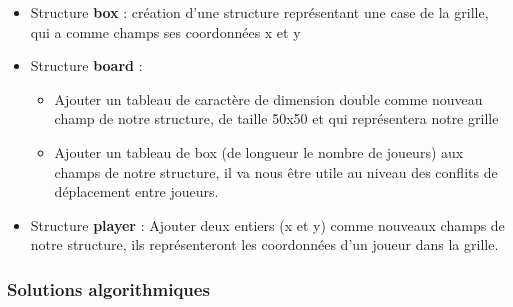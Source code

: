 \documentclass[a4paper]{article}
\begin{document}
\begin{itemize}
\item Structure \textbf{box}  :   création d’une structure représentant une case de la grille, qui a comme champs ses coordonnées x et y \\
\item Structure \textbf{board}  :
\begin{itemize}
\item Ajouter un tableau de caractère de dimension double comme nouveau champ de notre structure, de taille 50x50 et qui représentera notre grille 
\item Ajouter un tableau de box (de longueur le nombre de joueurs) aux champs de notre structure, il va nous être utile au niveau des conflits de déplacement entre joueurs.\\
\end{itemize} 

\item Structure \textbf{player}  :  Ajouter deux entiers (x et y) comme nouveaux champs de notre structure, ils représenteront les coordonnées d’un joueur dans la grille.
\end{itemize}

\newpage
\subsubsection{Solutions algorithmiques} 
\end{document}
